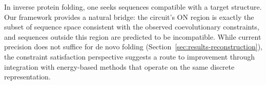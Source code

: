 In inverse protein folding, one seeks sequences compatible with a target
structure.  Our framework provides a natural bridge: the circuit's ON region
is exactly the subset of sequence space consistent with the observed
coevolutionary constraints, and sequences outside this region are predicted
to be incompatible.  While current precision does not suffice for de novo
folding (Section~\ref{sec:results-reconstruction}), the constraint
satisfaction perspective suggests a route to improvement through integration
with energy-based methods that operate on the same discrete representation.
